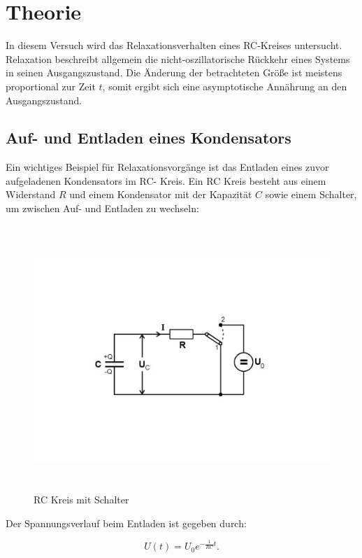 \section{Theorie}
\label{sec:Theorie}

In diesem Versuch wird das Relaxationsverhalten eines RC-Kreises untersucht.
Relaxation beschreibt allgemein die nicht-oszillatorische Rückkehr eines Systems in seinen Ausgangszustand.
Die Änderung der betrachteten Größe ist meistens proportional zur Zeit $t$, somit ergibt sich eine asymptotische
Annährung an den Ausgangszustand.

\subsection{Auf- und Entladen eines Kondensators}
Ein wichtiges Beispiel für Relaxationsvorgänge ist das Entladen eines zuvor aufgeladenen Kondensators im RC- Kreis.
Ein RC Kreis besteht aus einem Widerstand $R$ und einem Kondensator mit der Kapazität $C$ sowie einem Schalter, um zwischen 
Auf- und Entladen zu wechseln:
\begin{figure}
    \centering
    \includegraphics[height=10cm]{content/Theorie - RC-Kreis.pdf}
    \caption{RC Kreis mit Schalter \cite{v353}}
    \label{fig:Theorie - RC_Kreis}
\end{figure}

Der Spannungsverlauf beim Entladen ist gegeben durch:

\begin{equation}
    U(t)= U_{0}e^{-\frac{1}{RC}t} . \label{eqn:Entladen}
\end{equation}


